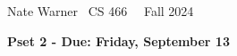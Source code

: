 \documentclass{report}
\title{\Huge{}}
\author{\huge{Nathan Warner}}
\date{\huge{}}
\begin{document}
    \pagebreak \bigbreak \noindent
    Nate Warner \ \quad \quad \quad \quad \quad \quad \quad \quad \quad \quad \quad \quad  CS 466 \quad  \quad \quad \quad \quad \quad \quad \quad \quad \ \ \quad \quad Fall 2024
    \begin{center}
        \textbf{Pset 2 - Due: Friday, September 13}
    \end{center}
    \bigbreak \noindent 
\end{document}
